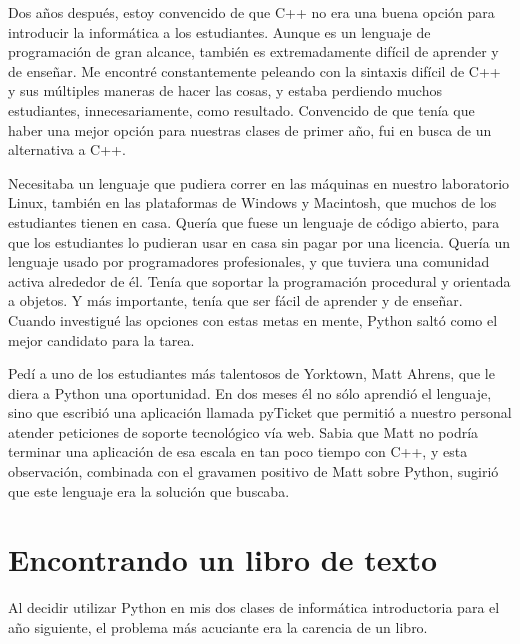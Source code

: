 Dos años después, estoy convencido de que C++ no era una buena opción para 
introducir la informática a los estudiantes. Aunque es un lenguaje de 
programación de gran alcance, también es extremadamente difícil de aprender y 
de enseñar.  Me encontré constantemente peleando con la sintaxis difícil de C++ 
y sus múltiples maneras de hacer las cosas, y estaba perdiendo muchos 
estudiantes, innecesariamente, como resultado. 
Convencido de que tenía que haber una mejor opción para nuestras clases de primer año, fui en busca de un alternativa a C++.
 
Necesitaba un lenguaje que pudiera correr en las máquinas en nuestro laboratorio
Linux, también en las plataformas de Windows y Macintosh, que muchos de los
estudiantes tienen en casa.  Quería que fuese un lenguaje de código abierto, 
para que los estudiantes lo pudieran usar en casa sin pagar por una licencia.  
Quería un lenguaje usado por programadores profesionales, y que tuviera una 
comunidad activa alrededor de él.  Tenía que soportar la programación 
procedural y orientada a objetos.  Y más importante, tenía que ser fácil de 
aprender y de enseñar.  
Cuando investigué las opciones con estas metas en mente, Python saltó como el
mejor candidato para la tarea. 
 
Pedí a uno de los estudiantes más talentosos de Yorktown, Matt Ahrens, que le
diera a Python una oportunidad.  En dos meses él no sólo aprendió el lenguaje,
sino que  escribió una aplicación llamada pyTicket que permitió a nuestro 
personal atender peticiones de soporte tecnológico vía web.  Sabia que Matt no 
podría terminar una aplicación de esa escala en tan poco tiempo con C++, y esta 
observación, combinada con el gravamen positivo de Matt sobre Python, sugirió 
que este lenguaje era la solución que buscaba. 
 
\section*{Encontrando un libro de texto}

Al decidir utilizar Python en mis dos clases de informática introductoria para 
el año siguiente, el problema más acuciante era la carencia de un libro.

